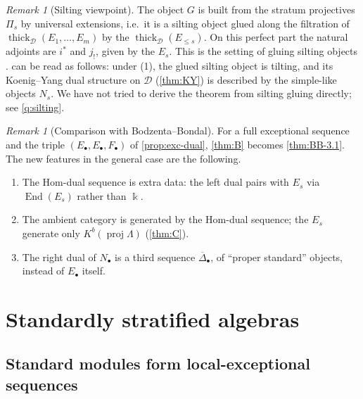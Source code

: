 \documentclass[11pt,reqno]{amsart}
\theoremstyle{plain}
\theoremstyle{definition}
\theoremstyle{remark}
\newtheorem{remark}[theorem]{Remark}
\newcommand{\kk}{\Bbbk}
\DeclareMathOperator{\End}{End}
\newcommand{\proj}{\operatorname{proj}}
\newcommand{\Kb}{K^b}
\newcommand{\thick}[2][\cD]{\operatorname{thick}_{#1}(#2)}
\newcommand{\Deltabar}{\overline{\Delta}}
\newcommand{\cD}{\mathcal{D}}
\begin{document}
\begin{remark}[Silting viewpoint]\label{rem:silting-view}
The object $G$ is built from the stratum projectives $\Pi_s$ by universal extensions, i.e.\ it is a silting object glued along the filtration of $\thick{E_1,\dots,E_m}$ by the $\thick{E_{\le s}}$. On this perfect part the natural adjoints are $i^*$ and $j_!$, given by the $E_s$. This is the setting of gluing silting objects \cite{LVY14}.  can be read as follows: under (1), the glued silting object is tilting, and its Koenig--Yang dual structure on $\cD$ (\cref{thm:KY}) is described by the simple-like objects $N_s$. We have not tried to derive the theorem from silting gluing directly; see \cref{q:silting}.
\end{remark}

\begin{remark}[Comparison with Bodzenta--Bondal]\label{rem:B-vs-BB}
For a full exceptional sequence and the triple $(E_\bullet,E_\bullet,F_\bullet)$ of \cref{prop:exc-dual}, \cref{thm:B} becomes \cref{thm:BB-3.1}. The new features in the general case are the following.
\begin{enumerate}
\item The Hom-dual sequence is extra data: the left dual pairs with $E_s$ via $\End(E_s)$ rather than $\kk$.
\item The ambient category is generated by the Hom-dual sequence; the $E_s$ generate only $\Kb(\proj\Lambda)$ (\cref{thm:C}).
\item The right dual of $N_\bullet$ is a third sequence $\Deltabar_\bullet$, of ``proper standard'' objects, instead of $E_\bullet$ itself.
\end{enumerate}
\end{remark}

\section{Standardly stratified algebras}\label{sec:stratified}

\subsection{Standard modules form local-exceptional sequences}
\end{document}

